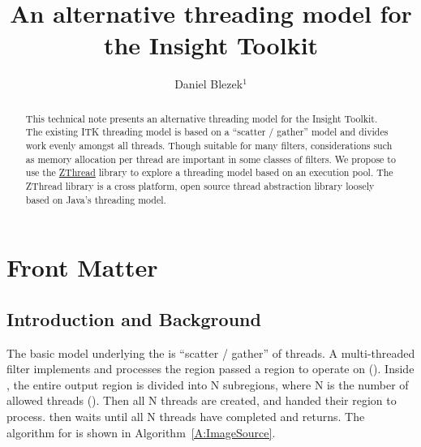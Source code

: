 \documentclass{InsightArticle}
\title{An alternative threading model for the Insight Toolkit}
\author{Daniel Blezek$^{1}$}
\begin{document}
%
% 


\maketitle

\ifhtml
\chapter*{Front Matter\label{front}}
\fi

\begin{abstract}
\noindent
This technical note presents an alternative threading model for the Insight Toolkit.  The existing ITK threading model is based on a ``scatter / gather'' model and divides work evenly amongst all threads.  Though suitable for many filters, considerations such as memory allocation per thread are important in some classes of filters.  We propose to use the \href{http://sourceforge.net/projects/zthread/}{ZThread} library to explore a threading model based on an execution pool.  The ZThread library is a cross platform, open source thread abstraction library loosely based on Java's threading model.
\end{abstract}


\tableofcontents
\clearpage
\section{Introduction and Background}
The basic model underlying the  is ``scatter / gather'' of threads.  A multi-threaded filter implements
 and processes the region passed a region to operate on ().  Inside
, the entire output region is divided into N subregions, where N is the number of allowed threads
().  Then all N threads are created, and handed their region to process. 
 then waits until all N threads have completed and returns.  The algorithm for
 is shown in Algorithm~\ref{A:ImageSource}.
\end{document}
